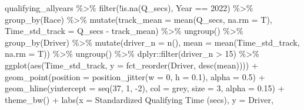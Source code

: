 \documentclass[
]{book}
\newenvironment{Shaded}{\begin{snugshade}}{\end{snugshade}}
\newcommand{\AttributeTok}[1]{\textcolor[rgb]{0.77,0.63,0.00}{#1}}
\newcommand{\DecValTok}[1]{\textcolor[rgb]{0.00,0.00,0.81}{#1}}
\newcommand{\FloatTok}[1]{\textcolor[rgb]{0.00,0.00,0.81}{#1}}
\newcommand{\FunctionTok}[1]{\textcolor[rgb]{0.00,0.00,0.00}{#1}}
\newcommand{\NormalTok}[1]{#1}
\newcommand{\SpecialCharTok}[1]{\textcolor[rgb]{0.00,0.00,0.00}{#1}}
\newcommand{\StringTok}[1]{\textcolor[rgb]{0.31,0.60,0.02}{#1}}
\begin{document}
\begin{Shaded}
\begin{Highlighting}[]
\NormalTok{qualifying\_allyears }\SpecialCharTok{\%\textgreater{}\%}
  \FunctionTok{filter}\NormalTok{(}\SpecialCharTok{!}\FunctionTok{is.na}\NormalTok{(Q\_secs),}
\NormalTok{         Year }\SpecialCharTok{==} \DecValTok{2022}\NormalTok{) }\SpecialCharTok{\%\textgreater{}\%}
  \FunctionTok{group\_by}\NormalTok{(Race) }\SpecialCharTok{\%\textgreater{}\%}
  \FunctionTok{mutate}\NormalTok{(}\AttributeTok{track\_mean =} \FunctionTok{mean}\NormalTok{(Q\_secs, }\AttributeTok{na.rm =}\NormalTok{ T),}
         \AttributeTok{Time\_std\_track =}\NormalTok{ Q\_secs }\SpecialCharTok{{-}}\NormalTok{ track\_mean) }\SpecialCharTok{\%\textgreater{}\%} 
  \FunctionTok{ungroup}\NormalTok{() }\SpecialCharTok{\%\textgreater{}\%} 
  \FunctionTok{group\_by}\NormalTok{(Driver) }\SpecialCharTok{\%\textgreater{}\%} 
  \FunctionTok{mutate}\NormalTok{(}\AttributeTok{driver\_n =} \FunctionTok{n}\NormalTok{(),}
         \AttributeTok{mean =} \FunctionTok{mean}\NormalTok{(Time\_std\_track, }\AttributeTok{na.rm =}\NormalTok{ T)) }\SpecialCharTok{\%\textgreater{}\%}
  \FunctionTok{ungroup}\NormalTok{() }\SpecialCharTok{\%\textgreater{}\%}
\NormalTok{  dplyr}\SpecialCharTok{::}\FunctionTok{filter}\NormalTok{(driver\_n }\SpecialCharTok{\textgreater{}} \DecValTok{15}\NormalTok{) }\SpecialCharTok{\%\textgreater{}\%} 
  \FunctionTok{ggplot}\NormalTok{(}\FunctionTok{aes}\NormalTok{(Time\_std\_track, }\AttributeTok{y =} \FunctionTok{fct\_reorder}\NormalTok{(Driver, }\FunctionTok{desc}\NormalTok{(mean)))) }\SpecialCharTok{+}
  \FunctionTok{geom\_point}\NormalTok{(}\AttributeTok{position =} \FunctionTok{position\_jitter}\NormalTok{(}\AttributeTok{w =} \DecValTok{0}\NormalTok{, }\AttributeTok{h =} \FloatTok{0.1}\NormalTok{), }\AttributeTok{alpha =} \FloatTok{0.5}\NormalTok{) }\SpecialCharTok{+}
  \FunctionTok{geom\_hline}\NormalTok{(}\AttributeTok{yintercept =} \FunctionTok{seq}\NormalTok{(}\DecValTok{37}\NormalTok{, }\DecValTok{1}\NormalTok{, }\SpecialCharTok{{-}}\DecValTok{2}\NormalTok{), }\AttributeTok{col =} \StringTok{\textquotesingle{}grey\textquotesingle{}}\NormalTok{, }\AttributeTok{size =} \DecValTok{3}\NormalTok{, }\AttributeTok{alpha =} \FloatTok{0.15}\NormalTok{) }\SpecialCharTok{+}
  \FunctionTok{theme\_bw}\NormalTok{() }\SpecialCharTok{+}
  \FunctionTok{labs}\NormalTok{(}\AttributeTok{x =} \StringTok{\textquotesingle{}Standardized Qualifying Time (secs)\textquotesingle{}}\NormalTok{,}
       \AttributeTok{y =} \StringTok{\textquotesingle{}Driver\textquotesingle{}}\NormalTok{,}

\end{Highlighting}
\end{Shaded}
\end{document}

